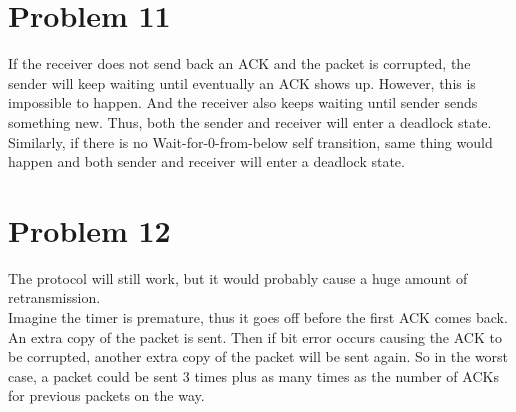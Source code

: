 \documentclass[titlepage, paper=a4, fontsize=11pt]{scrartcl} %
\numberwithin{equation}{section} %
\numberwithin{table}{section} %
\begin{document}
\section*{Problem 11}
If the receiver does not send back an ACK and the packet is corrupted, the sender will keep waiting until eventually an ACK shows up.
However, this is impossible to happen. And the receiver also keeps waiting until sender sends something
new. Thus, both the sender and receiver will enter a deadlock state. \\

Similarly, if there is no Wait-for-0-from-below self transition, same thing would happen and both sender
and receiver will enter a deadlock state.
\\

\newpage


\section*{Problem 12}
The protocol will still work, but it would probably cause a huge amount of retransmission. \\
Imagine the timer is premature, thus it goes off before the first ACK comes back. An extra copy of
the packet is sent. Then if bit error occurs causing the ACK to be corrupted, another extra copy of the packet will be sent again. So in the worst case, a packet could be sent 3 times plus as many times as the number of ACKs for previous packets on the way.
\\


\end{document}

